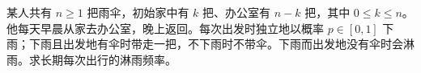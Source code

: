 某人共有 $n\ge1$ 把雨伞，初始家中有 $k$ 把、办公室有 $n-k$ 把，其中 $0\le k\le n$。他每天早晨从家去办公室，晚上返回。每次出发时独立地以概率 $p\in[0,1]$ 下雨；下雨且出发地有伞时带走一把，不下雨时不带伞。下雨而出发地没有伞时会淋雨。求长期每次出行的淋雨频率。
